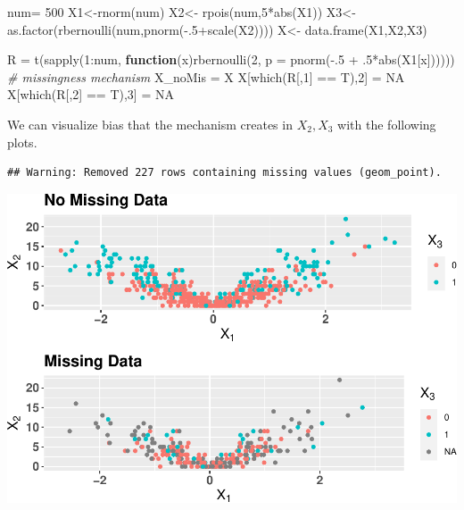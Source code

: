 \documentclass[
]{article}
\newenvironment{Shaded}{\begin{snugshade}}{\end{snugshade}}
\newcommand{\AttributeTok}[1]{\textcolor[rgb]{0.77,0.63,0.00}{#1}}
\newcommand{\CommentTok}[1]{\textcolor[rgb]{0.56,0.35,0.01}{\textit{#1}}}
\newcommand{\ConstantTok}[1]{\textcolor[rgb]{0.00,0.00,0.00}{#1}}
\newcommand{\ControlFlowTok}[1]{\textcolor[rgb]{0.13,0.29,0.53}{\textbf{#1}}}
\newcommand{\DecValTok}[1]{\textcolor[rgb]{0.00,0.00,0.81}{#1}}
\newcommand{\FunctionTok}[1]{\textcolor[rgb]{0.00,0.00,0.00}{#1}}
\newcommand{\NormalTok}[1]{#1}
\newcommand{\OtherTok}[1]{\textcolor[rgb]{0.56,0.35,0.01}{#1}}
\newcommand{\SpecialCharTok}[1]{\textcolor[rgb]{0.00,0.00,0.00}{#1}}
\begin{document}
\begin{Shaded}
\begin{Highlighting}[]
\NormalTok{num}\OtherTok{=} \DecValTok{500}
\NormalTok{X1}\OtherTok{\textless{}{-}}\FunctionTok{rnorm}\NormalTok{(num)}
\NormalTok{X2}\OtherTok{\textless{}{-}} \FunctionTok{rpois}\NormalTok{(num,}\DecValTok{5}\SpecialCharTok{*}\FunctionTok{abs}\NormalTok{(X1))}
\NormalTok{X3}\OtherTok{\textless{}{-}} \FunctionTok{as.factor}\NormalTok{(}\FunctionTok{rbernoulli}\NormalTok{(num,}\FunctionTok{pnorm}\NormalTok{(}\SpecialCharTok{{-}}\NormalTok{.}\DecValTok{5}\SpecialCharTok{+}\FunctionTok{scale}\NormalTok{(X2))))}
\NormalTok{X}\OtherTok{\textless{}{-}} \FunctionTok{data.frame}\NormalTok{(X1,X2,X3)}

\NormalTok{R }\OtherTok{=} \FunctionTok{t}\NormalTok{(}\FunctionTok{sapply}\NormalTok{(}\DecValTok{1}\SpecialCharTok{:}\NormalTok{num, }\ControlFlowTok{function}\NormalTok{(x)}\FunctionTok{rbernoulli}\NormalTok{(}\DecValTok{2}\NormalTok{, }\AttributeTok{p =} \FunctionTok{pnorm}\NormalTok{(}\SpecialCharTok{{-}}\NormalTok{.}\DecValTok{5} \SpecialCharTok{+}\NormalTok{ .}\DecValTok{5}\SpecialCharTok{*}\FunctionTok{abs}\NormalTok{(X1[x]))))) }\CommentTok{\# missingness mechanism}
\NormalTok{X\_noMis }\OtherTok{=}\NormalTok{ X}
\NormalTok{X[}\FunctionTok{which}\NormalTok{(R[,}\DecValTok{1}\NormalTok{] }\SpecialCharTok{==}\NormalTok{ T),}\DecValTok{2}\NormalTok{] }\OtherTok{=} \ConstantTok{NA}
\NormalTok{X[}\FunctionTok{which}\NormalTok{(R[,}\DecValTok{2}\NormalTok{] }\SpecialCharTok{==}\NormalTok{ T),}\DecValTok{3}\NormalTok{] }\OtherTok{=} \ConstantTok{NA}
\end{Highlighting}
\end{Shaded}

We can visualize bias that the mechanism creates in \(X_{2}, X_{3}\)
with the following plots.

\begin{verbatim}
## Warning: Removed 227 rows containing missing values (geom_point).
\end{verbatim}

\includegraphics{README_files/figure-latex/unnamed-chunk-2-1.pdf}
\end{document}
